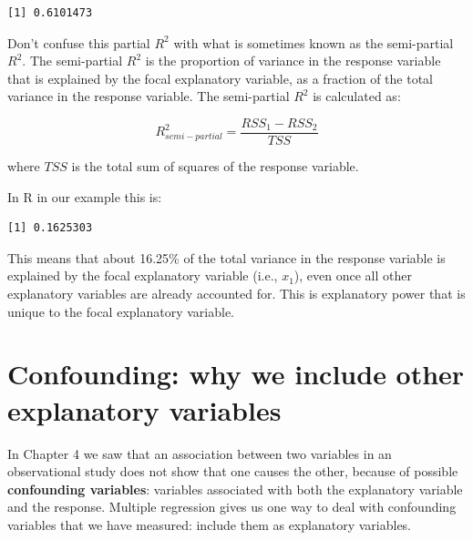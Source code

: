 \documentclass[
  letterpaper,
  8pt,
  a4paper]{book}
\newenvironment{Shaded}{\begin{snugshade}}{\end{snugshade}}
\newcommand{\DecValTok}[1]{\textcolor[rgb]{0.68,0.00,0.00}{#1}}
\newcommand{\FunctionTok}[1]{\textcolor[rgb]{0.28,0.35,0.67}{#1}}
\newcommand{\NormalTok}[1]{\textcolor[rgb]{0.00,0.23,0.31}{#1}}
\newcommand{\OtherTok}[1]{\textcolor[rgb]{0.00,0.23,0.31}{#1}}
\newcommand{\SpecialCharTok}[1]{\textcolor[rgb]{0.37,0.37,0.37}{#1}}
\begin{document}
\begin{verbatim}
[1] 0.6101473
\end{verbatim}

Don't confuse this partial \(R^2\) with what is sometimes known as the
semi-partial \(R^2\). The semi-partial \(R^2\) is the proportion of
variance in the response variable that is explained by the focal
explanatory variable, as a fraction of the total variance in the
response variable. The semi-partial \(R^2\) is calculated as:

\[R^2_{semi-partial} = \frac{RSS_1 - RSS_2}{TSS}\]

where \(TSS\) is the total sum of squares of the response variable.

In R in our example this is:

\begin{Shaded}
\end{Shaded}

\begin{verbatim}
[1] 0.1625303
\end{verbatim}

This means that about 16.25\% of the total variance in the response
variable is explained by the focal explanatory variable (i.e., \(x_1\)),
even once all other explanatory variables are already accounted for.
This is explanatory power that is unique to the focal explanatory
variable.

\section*{Confounding: why we include other explanatory
variables}\label{confounding-why-we-include-other-explanatory-variables}


In Chapter 4 we saw that an association between two variables in an
observational study does not show that one causes the other, because of
possible \textbf{confounding variables}: variables associated with both
the explanatory variable and the response. Multiple regression gives us
one way to deal with confounding variables that we have measured:
include them as explanatory variables.
\end{document}
